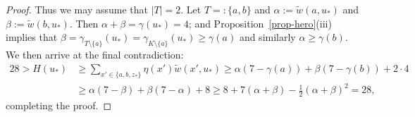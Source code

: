 \documentclass[10pt,a4paper]{article}
\theoremstyle{definition}
\begin{document}
\begin{proof}
	Thus we may assume that $|T| = 2$.
	Let $T =: \lbrace a,b\rbrace$ and $\alpha := \tilde{w}(a,u_*)$ and $\beta := \tilde{w}(b,u_*)$.
	Then $\alpha+\beta=\gamma(u_*)=4$; and Proposition~\ref{prop-hero}(iii) implies that 
	$\beta = \gamma_{T\setminus\{a\}}(u_*) = \gamma_{K\setminus\{a\}}(u_*) \geq \gamma(a)$
	and similarly $\alpha \geq \gamma(b)$. We then arrive at the final contradiction:
	\begin{align*}
		28>H(u_*) &\geq \sum_{x' \in \{a,b,z_*\}}\eta(x')\tilde{w}(x',u_*) \ge \alpha(7-\gamma(a)) + \beta(7-\gamma(b)) + 2\cdot 4\\ &\ge \alpha(7-\beta) + \beta(7-\alpha) + 8\ge  8 + 7(\alpha+\beta)-\frac{1}{2}(\alpha+\beta)^2=28,
	\end{align*}
	completing the proof.
\end{proof}
 
\end{document}
